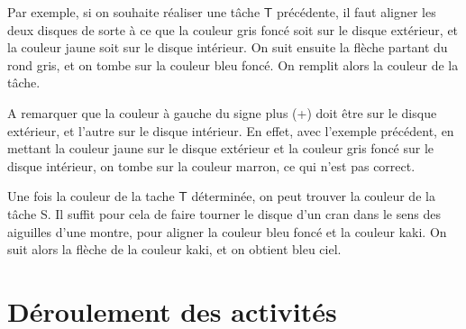 \documentclass{article}
\begin{document}
\begin{center}
    
\end{center}

Par exemple, si on souhaite réaliser une tâche $\textsf{T}$ précédente, il faut aligner les deux disques de sorte à ce que la couleur gris foncé soit sur le disque extérieur, et la couleur jaune soit sur le disque intérieur. On suit ensuite la flèche partant du rond gris, et on tombe sur la couleur bleu foncé. On remplit alors la couleur de la tâche.



A remarquer que la couleur à gauche du signe plus (+) doit être sur le disque extérieur, et l'autre sur le disque intérieur. En effet, avec l'exemple précédent, en mettant la couleur jaune sur le disque extérieur et la couleur gris foncé sur le disque intérieur, on tombe sur la couleur marron, ce qui n'est pas correct. 


\begin{center}
\end{center}

Une fois la couleur de la tache $\textsf{T}$ déterminée, on peut trouver la couleur de la tâche S. Il suffit pour cela de faire tourner le disque d'un cran dans le sens des aiguilles d'une montre, pour aligner la couleur bleu foncé et la couleur kaki. On suit alors la flèche de la couleur kaki, et on obtient bleu ciel.

\begin{center}
\end{center}



\section{Déroulement des activités}
\end{document}
